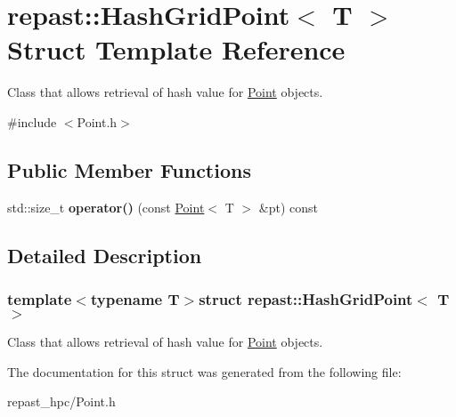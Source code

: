 \hypertarget{structrepast_1_1_hash_grid_point}{\section{repast\-:\-:Hash\-Grid\-Point$<$ T $>$ Struct Template Reference}
\label{structrepast_1_1_hash_grid_point}
}


Class that allows retrieval of hash value for \hyperlink{classrepast_1_1_point}{Point} objects.  




{\ttfamily \#include $<$Point.\-h$>$}

\subsection*{Public Member Functions}
\begin{DoxyCompactItemize}
\item 
\hypertarget{structrepast_1_1_hash_grid_point_a9fad86917c52a2719abe4ef8ca0167fa}{std\-::size\-\_\-t {\bfseries operator()} (const \hyperlink{classrepast_1_1_point}{Point}$<$ T $>$ \&pt) const }\label{structrepast_1_1_hash_grid_point_a9fad86917c52a2719abe4ef8ca0167fa}

\end{DoxyCompactItemize}


\subsection{Detailed Description}
\subsubsection*{template$<$typename T$>$struct repast\-::\-Hash\-Grid\-Point$<$ T $>$}

Class that allows retrieval of hash value for \hyperlink{classrepast_1_1_point}{Point} objects. 

The documentation for this struct was generated from the following file\-:\begin{DoxyCompactItemize}
\item 
repast\-\_\-hpc/Point.\-h\end{DoxyCompactItemize}

